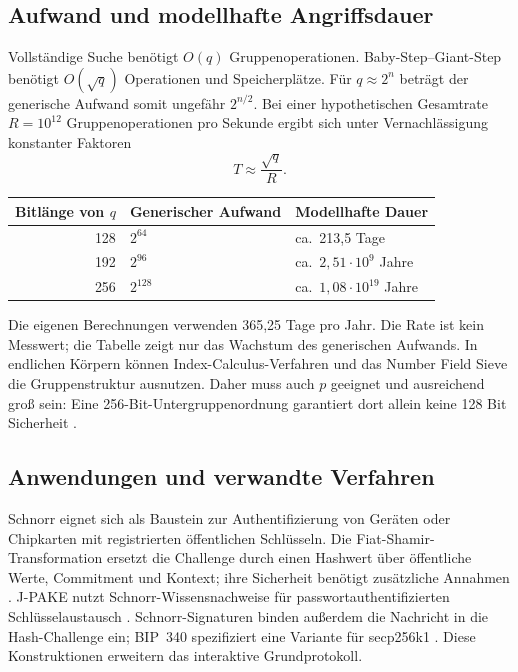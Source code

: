 \subsection{Aufwand und modellhafte Angriffsdauer}
\label{Aufwand-und-modellhafte-Angriffsdauer}
Vollständige Suche benötigt $O(q)$ Gruppenoperationen. Baby-Step--Giant-Step benötigt $O(\sqrt q)$ Operationen und Speicherplätze.
Für $q\approx2^n$ beträgt der generische Aufwand somit ungefähr $2^{n/2}$. Bei einer hypothetischen Gesamtrate $R=10^{12}$ Gruppenoperationen pro Sekunde ergibt sich unter Vernachlässigung konstanter Faktoren
\begin{equation}\label{eq:zeit}
 T\approx\frac{\sqrt q}{R}.
\end{equation}
\begin{center}
\begin{tabular}{rll}
\toprule
Bitlänge von $q$ & Generischer Aufwand & Modellhafte Dauer\\
\midrule
128 & $2^{64}$ & ca.\ 213,5 Tage\\
192 & $2^{96}$ & ca.\ $2{,}51\cdot10^9$ Jahre\\
256 & $2^{128}$ & ca.\ $1{,}08\cdot10^{19}$ Jahre\\
\bottomrule
\end{tabular}
\end{center}
Die eigenen Berechnungen verwenden 365,25 Tage pro Jahr. Die Rate ist kein Messwert; die Tabelle zeigt nur das Wachstum des generischen Aufwands. In endlichen Körpern können Index-Calculus-Verfahren und das Number Field Sieve die Gruppenstruktur ausnutzen. Daher muss auch $p$ geeignet und ausreichend groß sein: Eine 256-Bit-Untergruppenordnung garantiert dort allein keine 128 Bit Sicherheit \cite{galbraith2012}.

\subsection{Anwendungen und verwandte Verfahren}
\label{Anwendungen-und-verwandte-Verfahren}
Schnorr eignet sich als Baustein zur Authentifizierung von Geräten oder Chipkarten mit registrierten öffentlichen Schlüsseln. Die Fiat-Shamir-Transformation ersetzt die Challenge durch einen Hashwert über öffentliche Werte, Commitment und Kontext; ihre Sicherheit benötigt zusätzliche Annahmen \cite{hao2017}. J-PAKE nutzt Schnorr-Wissensnachweise für passwortauthentifizierten Schlüsselaustausch \cite{hao2017jpake}. Schnorr-Signaturen binden außerdem die Nachricht in die Hash-Challenge ein; BIP~340 spezifiziert eine Variante für secp256k1 \cite{wuille2020bip340}. Diese Konstruktionen erweitern das interaktive Grundprotokoll.

